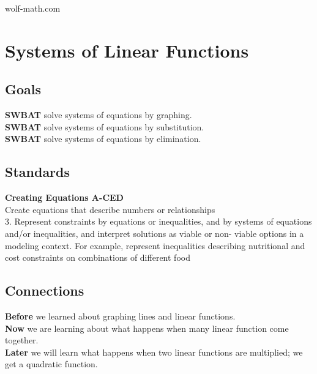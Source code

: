 \documentclass[11pt]{article}
\begin{document}
wolf-math.com\\

\section*{Systems of Linear Functions}

\subsection*{Goals}

\textbf{SWBAT} solve systems of equations by graphing.\\

\textbf{SWBAT} solve systems of equations by substitution.\\

\textbf{SWBAT} solve systems of equations by elimination.\\

\subsection*{Standards} 

\textbf{Creating Equations \hfill A-CED}\\

Create equations that describe numbers or relationships\\

3.	 Represent constraints by equations or inequalities, and by systems of
equations and/or inequalities, and interpret solutions as viable or non-
viable options in a modeling context. For example, represent inequalities
describing nutritional and cost constraints on combinations of different
food\\

\subsection*{Connections}

\textbf{Before} we learned about graphing lines and linear functions.  \\

\textbf{Now} we are learning about what happens when many linear function come together.\\

\textbf{Later} we will learn what happens when two linear functions are multiplied; we get a quadratic function.\\
\end{document}
